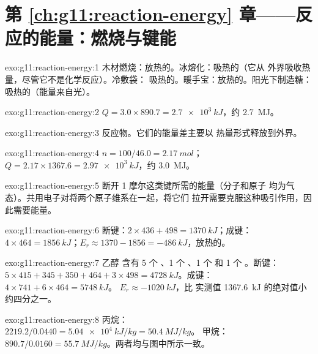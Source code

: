 \section*{第 \ref{ch:g11:reaction-energy} 章——反应的能量：燃烧与键能}

\begin{solution}{exo:g11:reaction-energy:1}
木材燃烧：放热的。冰熔化：吸热的（它从
外界吸收热量，尽管它不是化学反应）。冷敷袋：
吸热的。暖手宝：放热的。阳光下制造糖：
吸热的（能量来自光）。
\end{solution}

\begin{solution}{exo:g11:reaction-energy:2}
$Q = 3.0 \times 890.7 = \qty{2.7e3}{kJ}$，约 \qty{2.7}{MJ}。
\end{solution}

\begin{solution}{exo:g11:reaction-energy:3}
反应物。它们的能量差主要以
热量形式释放到外界。
\end{solution}

\begin{solution}{exo:g11:reaction-energy:4}
$n = 100 / 46.0 = \qty{2.17}{mol}$；$Q = 2.17 \times 1367.6 =
\qty{2.97e3}{kJ}$，约 \qty{3.0}{MJ}。
\end{solution}

\begin{solution}{exo:g11:reaction-energy:5}
断开 1 摩尔这类键所需的能量（分子和原子
均为气态）。共用电子对将两个原子维系在一起，将它们
拉开需要克服这种吸引作用，因此需要能量。
\end{solution}

\begin{solution}{exo:g11:reaction-energy:6}
断键：$2 \times 436 + 498 = \qty{1370}{kJ}$；成键：
$4 \times 464 = \qty{1856}{kJ}$；$E_r \approx 1370 - 1856 =
\qty{-486}{kJ}$，放热的。
\end{solution}

\begin{solution}{exo:g11:reaction-energy:7}
乙醇  含有 5 个 、1 个 、1 个  和 1
个 。断键：$5 \times 415 + 345 + 350 + 464 + 3 \times 498 =
\qty{4728}{kJ}$。成键：$4 \times 741 + 6 \times 464 = \qty{5748}{kJ}$。
$E_r \approx \qty{-1020}{kJ}$，比
实测值 \qty{1367.6}{kJ} 的绝对值小约四分之一。
\end{solution}

\begin{solution}{exo:g11:reaction-energy:8}
丙烷：$2219.2 / 0.0440 = \qty{5.04e4}{kJ/kg} = \qty{50.4}{MJ/kg}$。
甲烷：$890.7 / 0.0160 = \qty{55.7}{MJ/kg}$。两者均与图中所示一致。
\end{solution}

